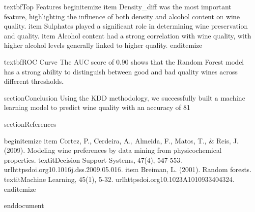 textbf{Top Features}
begin{itemize}
    item Density_diff was the most important feature, highlighting the influence of both density and alcohol content on wine quality.
    item Sulphates played a significant role in determining wine preservation and quality.
    item Alcohol content had a strong correlation with wine quality, with higher alcohol levels generally linked to higher quality.
end{itemize}

textbf{ROC Curve} The AUC score of 0.90 shows that the Random Forest model has a strong ability to distinguish between good and bad quality wines across different thresholds.

section{Conclusion}
Using the KDD methodology, we successfully built a machine learning model to predict wine quality with an accuracy of 81%


section{References}

begin{itemize}
    item Cortez, P., Cerdeira, A., Almeida, F., Matos, T., & Reis, J. (2009). Modeling wine preferences by data mining from physicochemical properties. textit{Decision Support Systems}, 47(4), 547-553. url{httpsdoi.org10.1016j.dss.2009.05.016}.
    item Breiman, L. (2001). Random forests. textit{Machine Learning}, 45(1), 5-32. url{httpsdoi.org10.1023A1010933404324}.
end{itemize}

end{document}
